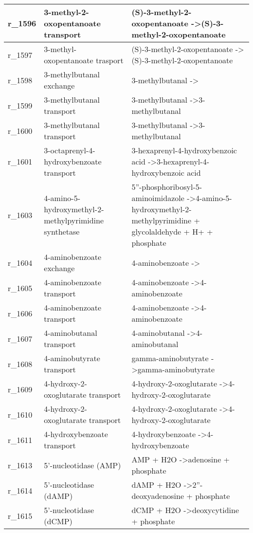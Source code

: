 \begin{landscape}
{\begin{longtable}{|l|p{7cm}|p{15cm}|}
r\_1596 & 3-methyl-2-oxopentanoate transport & (S)-3-methyl-2-oxopentanoate  -\textgreater (S)-3-methyl-2-oxopentanoate \\ \hline
r\_1597 & 3-methyl-oxopentanoate trasport & (S)-3-methyl-2-oxopentanoate  -\textgreater (S)-3-methyl-2-oxopentanoate \\ \hline
r\_1598 & 3-methylbutanal exchange & 3-methylbutanal  -\textgreater{} \\ \hline
r\_1599 & 3-methylbutanal transport & 3-methylbutanal  -\textgreater 3-methylbutanal \\ \hline
r\_1600 & 3-methylbutanal transport & 3-methylbutanal  -\textgreater 3-methylbutanal \\ \hline
r\_1601 & 3-octaprenyl-4-hydroxybenzoate transport & 3-hexaprenyl-4-hydroxybenzoic acid  -\textgreater 3-hexaprenyl-4-hydroxybenzoic acid \\ \hline
r\_1603 & 4-amino-5-hydroxymethyl-2-methylpyrimidine synthetase & 5''-phosphoribosyl-5-aminoimidazole  -\textgreater 4-amino-5-hydroxymethyl-2-methylpyrimidine + glycolaldehyde + H+ + phosphate \\ \hline
r\_1604 & 4-aminobenzoate exchange & 4-aminobenzoate  -\textgreater{} \\ \hline
r\_1605 & 4-aminobenzoate transport & 4-aminobenzoate  -\textgreater 4-aminobenzoate \\ \hline
r\_1606 & 4-aminobenzoate transport & 4-aminobenzoate  -\textgreater 4-aminobenzoate \\ \hline
r\_1607 & 4-aminobutanal transport & 4-aminobutanal  -\textgreater 4-aminobutanal \\ \hline
r\_1608 & 4-aminobutyrate transport & gamma-aminobutyrate  -\textgreater gamma-aminobutyrate \\ \hline
r\_1609 & 4-hydroxy-2-oxoglutarate transport & 4-hydroxy-2-oxoglutarate  -\textgreater 4-hydroxy-2-oxoglutarate \\ \hline
r\_1610 & 4-hydroxy-2-oxoglutarate transport & 4-hydroxy-2-oxoglutarate  -\textgreater 4-hydroxy-2-oxoglutarate \\ \hline
r\_1611 & 4-hydroxybenzoate transport & 4-hydroxybenzoate  -\textgreater 4-hydroxybenzoate \\ \hline
r\_1613 & 5'-nucleotidase (AMP) & AMP + H2O  -\textgreater adenosine + phosphate \\ \hline
r\_1614 & 5'-nucleotidase (dAMP) & dAMP + H2O  -\textgreater 2''-deoxyadenosine + phosphate \\ \hline
r\_1615 & 5'-nucleotidase (dCMP) & dCMP + H2O  -\textgreater deoxycytidine + phosphate \\ \hline

\end{longtable}}
\end{landscape}
